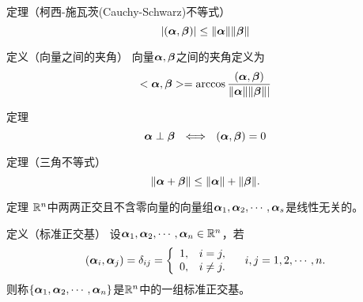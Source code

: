 \begin{frame}
  \begin{footnotesize}
    \begin{block}{定理（柯西-施瓦茨(Cauchy-Schwarz)不等式）}
      $$
      |(\boldsymbol{\alpha},\boldsymbol{\beta})|\le\|\boldsymbol{\alpha}\|\|\boldsymbol{\beta}\|
      $$
    \end{block}
  
%
    \begin{block}{定义（向量之间的夹角）}
    向量$\boldsymbol{\alpha},\boldsymbol{\beta}$之间的夹角定义为
    $$
    <\boldsymbol{\alpha},\boldsymbol{\beta}>=\arccos\frac{(\boldsymbol{\alpha},\boldsymbol{\beta})}{\|\boldsymbol{\alpha}\|\|\boldsymbol{\beta}\||}
    $$
    \end{block}
 
    \begin{block}{定理}
    $$\boldsymbol{\alpha}\perp\boldsymbol{\beta} ~~\Longleftrightarrow~~
   (\boldsymbol{\alpha},\boldsymbol{\beta})=0
    $$
    \end{block}


%
%
%
    \begin{block}{定理（三角不等式）}
      $$
      \|\boldsymbol{\alpha}+\boldsymbol{\beta}\|\le\|\boldsymbol{\alpha}\|+\|\boldsymbol{\beta}\|.
      $$
    \end{block}
   
  \end{footnotesize}
\end{frame}



\begin{frame}
  \begin{footnotesize}
    \begin{block}{定理}
      $\mathbb{R}^n$中两两正交且不含零向量的向量组$\boldsymbol{\alpha}_1,\boldsymbol{\alpha}_2,\cdots,\boldsymbol{\alpha}_s$是线性无关的。
    \end{block}
    
%
%
    \begin{block}{定义（标准正交基）}
      设$\boldsymbol{\alpha}_1,\boldsymbol{\alpha}_2,\cdots,\boldsymbol{\alpha}_n\in \mathbb{R}^n$，若
      $$
      (\boldsymbol{\alpha}_i,\boldsymbol{\alpha}_j)=\delta_{ij}=\left\{
      \begin{array}{ll}
        1,& i=j,\\
        0,& i\ne j.
      \end{array}
      \right. \quad i,j=1,2,\cdots,n.
      $$
      则称$\{\boldsymbol{\alpha}_1,\boldsymbol{\alpha}_2,\cdots,\boldsymbol{\alpha}_n\}$是$\mathbb{R}^n$中的一组标准正交基。
    \end{block}
  \end{footnotesize}
\end{frame}


